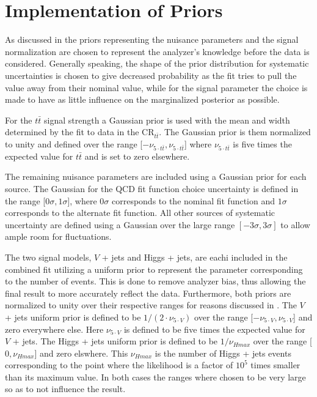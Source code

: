 \section{Implementation of Priors} \label{sec:fit:priors}

As discussed in  the priors representing the nuisance
parameters and the signal normalization are chosen to represent the analyzer's
knowledge before the data is considered. Generally speaking, the shape of the
prior distribution for systematic uncertainties is chosen to give decreased
probability as the fit tries to pull the value away from their nominal value,
while for the signal parameter the choice is made to have as little influence
on the marginalized posterior as possible.

For the $t\bar{t}$ signal strength a Gaussian prior is used with the mean and
width determined by the fit to data in the $\text{CR}_{t\bar{t}}$.  The
Gaussian prior is them normalized to unity and defined over the range [$-\nu_{5
\cdot t\bar{t}}, \nu_{5 \cdot t\bar{t}}$] where $\nu_{5 \cdot t\bar{t}}$ is five
times the expected value for $t\bar{t}$ and is set to zero elsewhere.

The remaining nuisance parameters are included using a Gaussian prior for each
source.  The Gaussian for the QCD fit function choice uncertainty is defined in
the range [$0\sigma, 1\sigma$], where $0\sigma$ corresponds to the nominal fit
function and $1\sigma$ corresponds to the alternate fit function.  All other
sources of systematic uncertainty are defined using a Gaussian over the large
range $[-3\sigma, 3\sigma]$ to allow ample room for fluctuations.
 
The two signal models, $V$ + jets and Higgs + jets, are eachi included in the
combined fit utilizing a uniform prior to represent the parameter corresponding
to the number of events.  This is done to remove analyzer bias, thus allowing
the final result to more accurately reflect the data.  Furthermore, both priors
are normalized to unity over their respective ranges for reasons discussed in
. The $V$ + jets uniform prior is defined to be $1/(2 \cdot
\nu_{5 \cdot V})$ over the range [$-\nu_{5 \cdot V}, \nu_{5 \cdot V}$] and zero
everywhere else. Here $\nu_{5 \cdot V}$ is defined to be five times the expected
value for $V$ + jets. The Higgs + jets uniform prior is defined to be
$1/\nu_{Hmax}$ over the range [$0,\nu_{Hmax}$] and zero elswhere.  This
$\nu_{Hmax}$ is the number of Higgs + jets events corresponding to the point
where the likelihood is a factor of $10^{5}$ times smaller than its maximum
value.  In both cases the ranges where chosen to be very large so as to not
influence the result.
